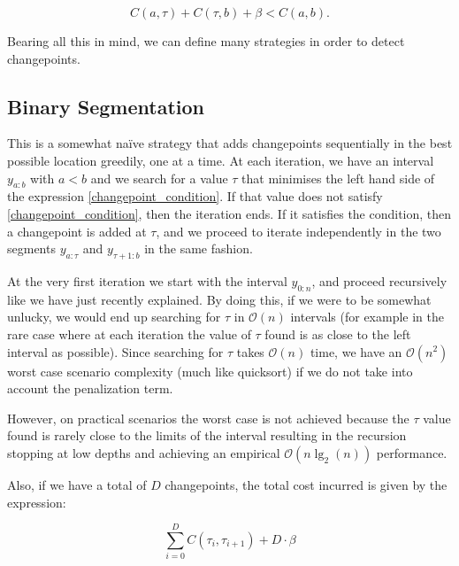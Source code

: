 \documentclass[pdflatex,sn-mathphys]{sn-jnl}%
\theoremstyle{thmstyleone}%
\theoremstyle{thmstyletwo}%
\theoremstyle{thmstylethree}%
\begin{document}
\begin{equation}
    C(a,\tau) + C(\tau, b) + \beta < C(a, b).
    \label{changepoint_condition}
\end{equation}

Bearing all this in mind, we can define many strategies in order to detect changepoints.

\subsection{Binary Segmentation}\label{binary_segmentation}

This is a somewhat na\"ive strategy that adds changepoints sequentially in the best possible location greedily, one at a time. At each iteration, we have an interval $y_{a:b}$ with $a < b$ and we search for a value $\tau$ that minimises the left hand side of the expression \ref{changepoint_condition}. If that value does not satisfy \ref{changepoint_condition}, then the iteration ends. If it satisfies the condition, then a changepoint is added at $\tau$, and we proceed to iterate independently in the two segments $y_{a:\tau}$ and $y_{\tau+1:b}$ in the same fashion. 

At the very first iteration we start with the interval $y_{0:n}$, and proceed recursively like we have just recently explained. By doing this, if we were to be somewhat unlucky, we would end up searching for $\tau$ in $\mathcal{O}(n)$ intervals (for example in the rare case where at each iteration the value of $\tau$ found is as close to the left interval as possible). Since searching for $\tau$ takes $\mathcal{O}(n)$ time, we have an $\mathcal{O}(n^2)$ worst case scenario complexity (much like quicksort) if we do not take into account the penalization term. 

However, on practical scenarios the worst case is not achieved because the $\tau$ value found is rarely close to the limits of the interval resulting in the recursion stopping at low depths and achieving an empirical $\mathcal{O}(n\lg_2(n))$ performance.

Also, if we have a total of $D$ changepoints, the total cost incurred is given by the expression:

\begin{equation}
    \sum\limits_{i=0}^D C(\tau_i, \tau_{i+1}) + D \cdot \beta
    \label{penalization_cost_function}
\end{equation}
\end{document}

